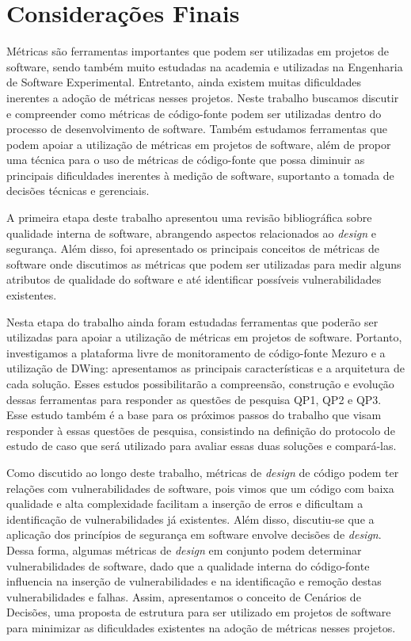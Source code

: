 \chapter{Considerações Finais}
\label{cap-consideracoesFinais}

Métricas são ferramentas importantes que podem ser utilizadas em projetos de software, sendo também muito estudadas na academia e utilizadas na Engenharia de Software Experimental. Entretanto, ainda existem muitas dificuldades inerentes a adoção de métricas nesses projetos. Neste trabalho buscamos discutir e compreender como métricas de código-fonte podem ser utilizadas dentro do processo de desenvolvimento de software. Também estudamos ferramentas que podem apoiar a utilização de métricas em projetos de software, além de propor uma técnica para o uso de métricas de código-fonte que possa diminuir as principais dificuldades inerentes à medição de software, suportanto a tomada de decisões técnicas e gerenciais.

%

A primeira etapa deste trabalho apresentou uma revisão bibliográfica sobre qualidade interna de software, abrangendo aspectos relacionados ao \emph{design} e segurança. Além disso, foi apresentado os principais conceitos de métricas de software onde discutimos as métricas que podem ser utilizadas para medir alguns atributos de qualidade do software e até identificar possíveis vulnerabilidades existentes.

%

Nesta etapa do trabalho ainda foram estudadas ferramentas que poderão ser utilizadas para apoiar a utilização de métricas em projetos de software. Portanto, investigamos a plataforma livre de monitoramento de código-fonte Mezuro e a utilização de DWing: apresentamos as principais características e a arquitetura de cada solução. Esses estudos possibilitarão a compreensão, construção e evolução dessas ferramentas para responder as questões de pesquisa QP1, QP2 e QP3. Esse estudo também é a base para os próximos passos do trabalho que visam responder à essas questões de pesquisa, consistindo na definição do protocolo de estudo de caso que será utilizado para avaliar essas duas soluções e compará-las.


Como discutido ao longo deste trabalho, métricas de \emph{design} de código podem ter relações com  vulnerabilidades de software, pois vimos que um código com baixa qualidade e alta complexidade facilitam a inserção de erros e dificultam a identificação de vulnerabilidades já existentes. Além disso, discutiu-se que a aplicação dos princípios de segurança em software envolve decisões de \emph{design}. Dessa forma, algumas métricas de \emph{design} em conjunto podem determinar vulnerabilidades de software, dado que a qualidade interna do código-fonte influencia na inserção de vulnerabilidades e na identificação e remoção destas vulnerabilidades e falhas. Assim, apresentamos o conceito de Cenários de Decisões, uma proposta de estrutura para ser utilizado em projetos de software para minimizar as dificuldades existentes na adoção de métricas nesses projetos.

